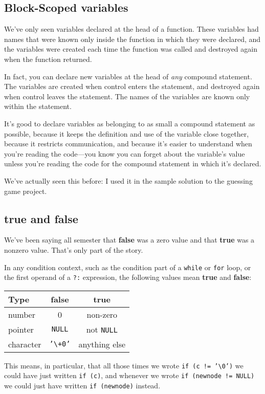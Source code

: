 \subsection{Block-Scoped variables}

We've only seen variables declared at the head of a function.  These
variables had names that were known only inside the function in which
they were declared, and the variables were created each time the
function was called and destroyed again when the function returned.

In fact, you can declare new variables at the head of {\em any}\/
compound statement.  The variables are created when control enters the
statement, and destroyed again when control leaves the statement.  The
names of the variables are known only within the statement.  

It's good to declare variables as belonging to as small a compound
statement as possible, because it keeps the definition and use of the
variable close together, because it restricts communication, and because
it's easier to understand when you're reading the code---you know you
can forget about the variable's value unless you're reading the code for
the compound statement in which it's declared.  

We've actually seen this before:  I used it in the sample solution to
the guessing game project.

\subsection{{\bf true} and {\bf false}}

We've been saying all semester that {\bf false} was a zero value and
that {\bf true} was a nonzero value.  That's only part of the story.

In any condition context, such as the condition part of a {\tt while} or
{\tt for} loop, or the first operand of a {\tt ?:} expression, the
following values mean {\bf true} and {\bf false}:

\begin{tabular}{l|cc}
Type & {\bf false } & {\bf true} \\ \hline
number & 0 & non-zero \\
pointer & {\tt NULL} & not {\tt NULL} \\
character & {\tt '\verb+\+0'} & anything else \\
\end{tabular}

This means, in particular, that all those times we wrote {\tt if (c !=
'\verb+\+0')} we could have just written {\tt if (c)}, and whenever we
wrote {\tt if (newnode != NULL)} we could just have written {\tt if
(newnode)} instead.  

